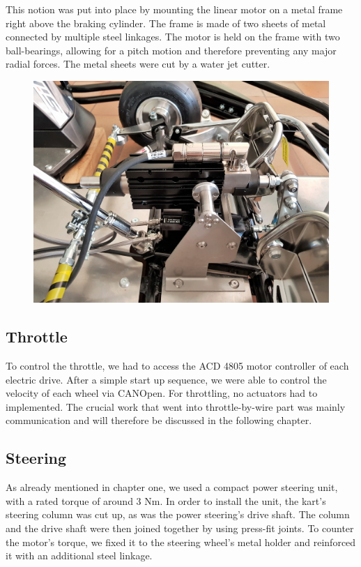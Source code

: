 This notion was put into place by mounting the linear motor on a metal frame right above the braking cylinder. The frame is made of two sheets of metal connected by multiple steel linkages. The motor is held on the frame with two ball-bearings, allowing for a pitch motion and therefore preventing any major radial forces.
The metal sheets were cut by a water jet cutter.

\begin{figure}[h]
	\centering
	\includegraphics[width=0.7\linewidth]{pictures_figures/Used/Picture_brake}
	\caption{}
	\label{fig:picturebrake}
\end{figure}

\subsection{Throttle}

To control the throttle, we had to access the ACD 4805 motor controller of each electric drive. After a simple start up sequence, we were able to control the velocity of each wheel via CANOpen. For throttling, no actuators had to implemented. The crucial work that went into throttle-by-wire part was mainly communication and will therefore be discussed in the following chapter.

\newpage

\subsection{Steering}

As already mentioned in chapter one, we used a compact power steering unit, with a rated torque of around 3 Nm. In order to install the unit, the kart's steering column was cut up, as was the power steering's drive shaft. The column and the drive shaft were then joined together by using press-fit joints. To counter the motor's torque, we fixed it to the steering wheel's metal holder and reinforced it with an additional steel linkage.

